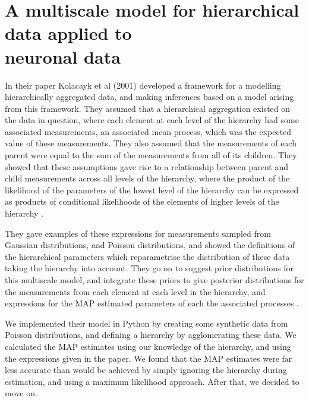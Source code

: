 \section{A multiscale model for hierarchical data applied to \\ neuronal data}
In their paper Kolacayk et al (2001) developed a framework for a modelling hierarchically aggregated data, and making inferences based on a model arising from this framework. They assumed that a hierarchical aggregation existed on the data in question, where each element at each level of the hierarchy had some associated measurements, an associated mean process, which was the expected value of these measurements. They also assumed that the measurements of each parent were equal to the sum of the measurements from all of its children. They showed that these assumptions gave rise to a relationship between parent and child measurements across all levels of the hierarchy, where the product of the likelihood of the parameters of the lowest level of the hierarchy can be expressed as products of conditional likelihoods of the elements of higher levels of the hierarchy \parencite{kolacayk}.

They gave examples of these expressions for measurements sampled from Gaussian distributions, and Poisson distributions, and showed the definitions of the hierarchical parameters which reparametrise the distribution of these data taking the hierarchy into account. They go on to suggest prior distributions for this multiscale model, and integrate these priors to give posterior distributions for the measurements from each element at each level in the hierarchy, and expressions for the MAP estimated parameters of each the associated processes \parencite{kolacayk}.

We implemented their model in Python by creating some synthetic data from Poisson distributions, and defining a hierarchy by agglomerating these data. We calculated the MAP estimates using our knowledge of the hierarchy, and using the expressions given in the paper. We found that the MAP estimates were far less accurate than would be achieved by simply ignoring the hierarchy during estimation, and using a maximum likelihood approach. After that, we decided to move on.
